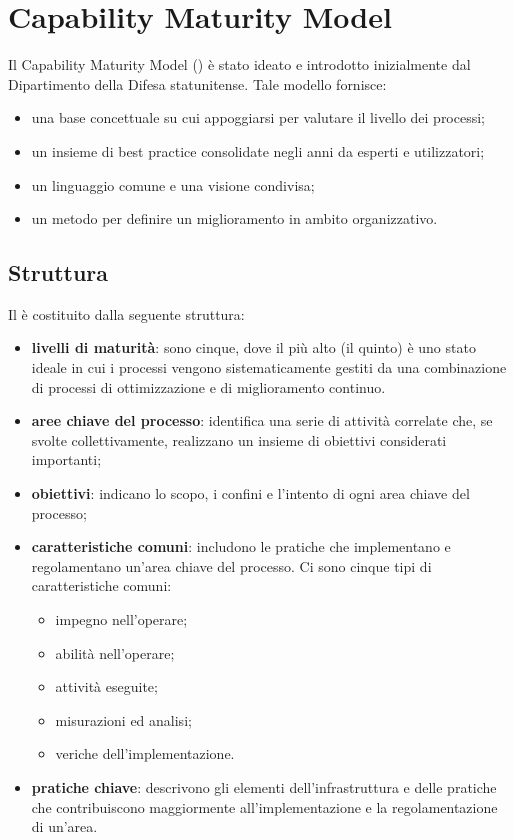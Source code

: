 \documentclass[PianoDiQualifica.tex]{subfiles}
\begin{document}
\hypertarget{CMM_label}{\section{Capability Maturity Model}}
	Il Capability Maturity Model () è stato ideato e introdotto inizialmente dal Dipartimento della Difesa statunitense. Tale modello
	fornisce:
	\begin{itemize}
		\item una base concettuale su cui appoggiarsi per valutare il livello dei processi;
		\item un insieme di best practice consolidate negli anni da esperti e utilizzatori;
		\item un linguaggio comune e una visione condivisa;
		\item un metodo per definire un miglioramento in ambito organizzativo.
	\end{itemize}
	\subsection{Struttura}
	Il  è costituito dalla seguente struttura:
	\begin{itemize}
		\item \textbf{livelli di maturità}: sono cinque, dove il più alto (il quinto) è uno stato ideale in cui i processi vengono sistematicamente
		gestiti da una combinazione di processi di ottimizzazione e di miglioramento continuo. 
		\item \textbf{aree chiave del processo}: identifica una serie di attività correlate che, se svolte collettivamente,
		realizzano un insieme di obiettivi considerati importanti;
		\item \textbf{obiettivi}: indicano lo scopo, i confini e l'intento di ogni area chiave del processo;
		\item \textbf{caratteristiche comuni}: includono le pratiche che implementano e regolamentano un'area chiave del processo. Ci sono cinque
		tipi di caratteristiche comuni:
		\begin{itemize}
			\item impegno nell'operare;
			\item abilità nell'operare;
			\item attività eseguite;
			\item misurazioni ed analisi;
			\item veriche dell'implementazione.
		\end{itemize}
		\item \textbf{pratiche chiave}: descrivono gli elementi dell'infrastruttura e delle pratiche che contribuiscono maggiormente all'implementazione
		e la regolamentazione di un'area.
	\end{itemize}
	
\end{document}
